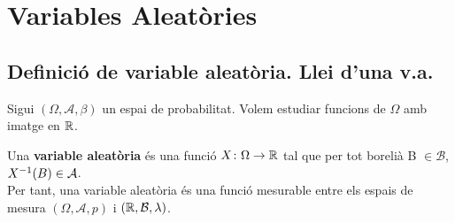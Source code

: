 \section{Variables Aleatòries}
\subsection{Definició de variable aleatòria. Llei d'una v.a.}
Sigui $(\Omega, \mathcal{A}, \beta)$  un espai de probabilitat. Volem estudiar funcions de $\Omega$ amb imatge en $\mathbb{R}$.

\begin{defi}
  Una \textbf{variable aleatòria} és una funció $X\colon \Omega \to \mathbb{R}$ tal que per tot borelià B 
  $\in \mathcal{B}$, $X^{-1}(B) \in \mathcal{A}$. \\
  
  Per tant, una variable aleatòria és una funció mesurable entre els espais de mesura $(\Omega, \mathcal{A}, p)$ i 
  $(\mathbb{R}, \mathcal{B}, \lambda)$.
\end{defi}

